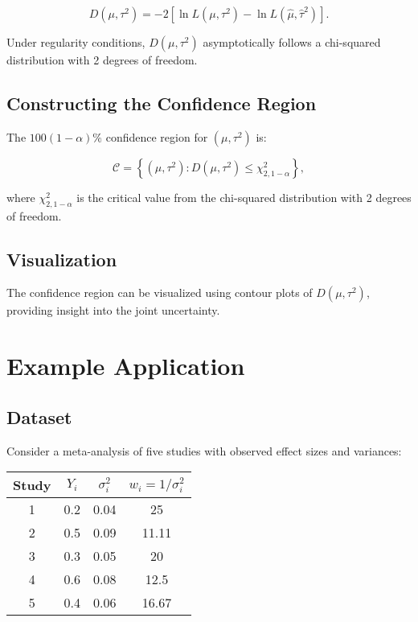 \documentclass[12pt,a4paper]{report}
\begin{document}
\begin{equation}
\label{eq:deviance_function}
D(\mu, \tau^2) = -2 \left[ \ln L(\mu, \tau^2) - \ln L(\hat{\mu}, \hat{\tau}^2) \right].
\end{equation}

Under regularity conditions, $D(\mu, \tau^2)$ asymptotically follows a chi-squared distribution with 2 degrees of freedom.

\subsection{Constructing the Confidence Region}
\label{subsec:constructing_confidence_region}

The $100(1 - \alpha)\%$ confidence region for $(\mu, \tau^2)$ is:

\begin{equation}
\label{eq:confidence_region}
\mathscr{C} = \left\{ (\mu, \tau^2) : D(\mu, \tau^2) \leq \chi^2_{2, 1 - \alpha} \right\},
\end{equation}

where $\chi^2_{2, 1 - \alpha}$ is the critical value from the chi-squared distribution with 2 degrees of freedom.

\subsection{Visualization}
\label{subsec:visualization}

The confidence region can be visualized using contour plots of $D(\mu, \tau^2)$, providing insight into the joint uncertainty.

\section{Example Application}
\label{sec:jcr_example}

\subsection{Dataset}
\label{subsec:jcr_dataset}

Consider a meta-analysis of five studies with observed effect sizes and variances:

\begin{center}
\begin{tabular}{cccc}
\toprule
\textbf{Study} & $Y_i$ & $\sigma_i^2$ & $w_i = 1/\sigma_i^2$ \\
\midrule
1 & 0.2 & 0.04 & 25 \\
2 & 0.5 & 0.09 & 11.11 \\
3 & 0.3 & 0.05 & 20 \\
4 & 0.6 & 0.08 & 12.5 \\
5 & 0.4 & 0.06 & 16.67 \\
\bottomrule
\end{tabular}
\end{center}
\end{document}

